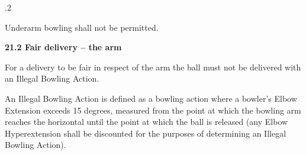 \documentclass[12pt]{article}
\begin{document}
\vspace{\baselineskip}
{\fontsize{9pt}{10.8pt}.2 \tabto{0.49in} {\fontsize{8pt}{9.6pt}\selectfont Underarm bowling shall not be permitted.\par}\par}\par


\vspace{\baselineskip}
{\fontsize{11pt}{13.2pt}\selectfont \textbf{21.2 \tabto{0.47in} Fair delivery – the arm}\par}\par


\vspace{\baselineskip}
{\fontsize{9pt}{10.8pt}\selectfont For a delivery to be fair in respect of the arm the ball must not be delivered with an Illegal Bowling Action.\par}\par


\vspace{\baselineskip}

\vspace{\baselineskip}

\vspace{\baselineskip}

\vspace{\baselineskip}

\vspace{\baselineskip}

\vspace{\baselineskip}
\begin{Center}
{\fontsize{8pt}{9.6pt}\par}
\end{Center}\par


\vspace{\baselineskip}

\vspace{\baselineskip}
\begin{adjustwidth}{0.0in}{0.12in}
{\fontsize{9pt}{10.8pt}\selectfont An Illegal Bowling Action is defined as a bowling action where a bowler’s Elbow Extension exceeds 15 degrees, measured from the point at which the bowling arm reaches the horizontal until the point at which the ball is released (any Elbow Hyperextension shall be discounted for the purposes of determining an Illegal Bowling Action).\par}\par

\end{adjustwidth}
\end{document}
